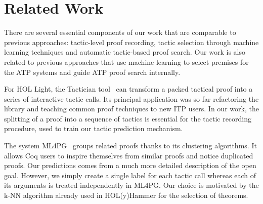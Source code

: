 \documentclass[runningheads,a4paper,draft]{svjour3}
\def\hollight{\textsf{HOL Light}\xspace}
\def\coq{\textsf{Coq}\xspace}
\def\holyhammer{\textsf{HOL(y)Hammer}\xspace}
\begin{document}
\section{Related Work}
There are several essential components of our work that are comparable to
previous approaches: tactic-level proof recording, tactic
selection through machine learning techniques and automatic tactic-based proof
search. Our work is also related to previous approaches that use machine
learning to select premises for the ATP systems and guide ATP proof search
internally.

For \hollight, the Tactician tool~\cite{DBLP:conf/sefm/Adams15}
can transform a packed tactical proof into a series of interactive tactic
calls. Its principal application
was so far refactoring the library and teaching common proof techniques to new
ITP users. In our work, the splitting of a proof into a sequence of tactics is
essential for the
tactic recording procedure, used to train our tactic prediction mechanism.

The system
\textsf{ML4PG}~\cite{DBLP:journals/corr/abs-1212-3618,DBLP:journals/mics/HerasK14}
groups related proofs thanks to its clustering
algorithms. It allows \coq users to inspire themselves from similar proofs and
notice
duplicated proofs. Our predictions comes from a much more detailed description
of the open goal.
However, we simply create a single label for each tactic call whereas each of
its
arguments is treated independently in \textsf{ML4PG}.
Our choice is motivated by the k-NN algorithm already used in
\holyhammer for the selection of theorems.
\end{document}
